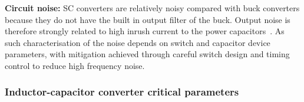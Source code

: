 \documentclass[letterpaper,twocolumn,10pt]{article}
\begin{document}
\textbf{Circuit noise: }SC converters are relatively noisy compared with buck converters because they do not have the built in output filter of the buck. Output noise is therefore strongly related to %
high inrush current to the power capacitors~\cite{Zheng2013}. As such characterisation of the noise depends on switch and capacitor device parameters, with mitigation achieved through careful switch design and timing control to reduce high frequency noise. 


\subsubsection{Inductor-capacitor converter critical parameters}
\end{document}
